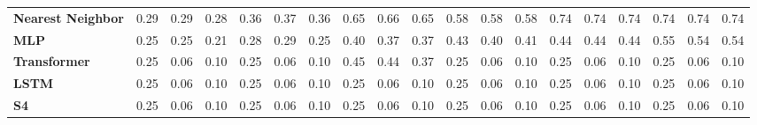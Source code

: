 \begin{table}[t]
{\begin{tabular}{l ccc ccc ccc ccc ccc ccc}
\textbf{Nearest Neighbor} & \cellcolor[HTML]{FF7B63}0.29 & \cellcolor[HTML]{FF7A64}0.29 & \cellcolor[HTML]{FF7A64}0.28 & \cellcolor[HTML]{FF9856}0.36 & \cellcolor[HTML]{FF9D54}0.37 & \cellcolor[HTML]{FF9856}0.36 & \cellcolor[HTML]{93D156}0.65 & \cellcolor[HTML]{92D156}0.66 & \cellcolor[HTML]{94D155}0.65 & \cellcolor[HTML]{C6D249}0.58 & \cellcolor[HTML]{C8D249}0.58 & \cellcolor[HTML]{C7D249}0.58 & \cellcolor[HTML]{5BCF64}0.74 & \cellcolor[HTML]{59CF64}0.74 & \cellcolor[HTML]{5ACF64}0.74 & \cellcolor[HTML]{59CF64}0.74 & \cellcolor[HTML]{59CF64}0.74 & \cellcolor[HTML]{59CF64}0.74 \\
\textbf{MLP} & \cellcolor[HTML]{FF6C6B}0.25 & \cellcolor[HTML]{FF6C6B}0.25 & \cellcolor[HTML]{FF6B6B}0.21 & \cellcolor[HTML]{FF7766}0.28 & \cellcolor[HTML]{FF7C63}0.29 & \cellcolor[HTML]{FF6B6B}0.25 & \cellcolor[HTML]{FFA94F}0.40 & \cellcolor[HTML]{FF9F53}0.37 & \cellcolor[HTML]{FF9C55}0.37 & \cellcolor[HTML]{FFB649}0.43 & \cellcolor[HTML]{FFAB4E}0.40 & \cellcolor[HTML]{FFAD4D}0.41 & \cellcolor[HTML]{FFBC46}0.44 & \cellcolor[HTML]{FFBC46}0.44 & \cellcolor[HTML]{FFBB46}0.44 & \cellcolor[HTML]{DBD344}0.55 & \cellcolor[HTML]{E3D342}0.54 & \cellcolor[HTML]{E1D342}0.54 \\
\textbf{Transformer} & \cellcolor[HTML]{FF6B6B}0.25 & \cellcolor[HTML]{FF6B6B}0.06 & \cellcolor[HTML]{FF6B6B}0.10 & \cellcolor[HTML]{FF6B6B}0.25 & \cellcolor[HTML]{FF6B6B}0.06 & \cellcolor[HTML]{FF6B6B}0.10 & \cellcolor[HTML]{FFBD46}0.45 & \cellcolor[HTML]{FFBC46}0.44 & \cellcolor[HTML]{FF9F53}0.37 & \cellcolor[HTML]{FF6B6B}0.25 & \cellcolor[HTML]{FF6B6B}0.06 & \cellcolor[HTML]{FF6B6B}0.10 & \cellcolor[HTML]{FF6B6B}0.25 & \cellcolor[HTML]{FF6B6B}0.06 & \cellcolor[HTML]{FF6B6B}0.10 & \cellcolor[HTML]{FF6B6B}0.25 & \cellcolor[HTML]{FF6B6B}0.06 & \cellcolor[HTML]{FF6B6B}0.10 \\
\textbf{LSTM} & \cellcolor[HTML]{FF6B6B}0.25 & \cellcolor[HTML]{FF6B6B}0.06 & \cellcolor[HTML]{FF6B6B}0.10 & \cellcolor[HTML]{FF6B6B}0.25 & \cellcolor[HTML]{FF6B6B}0.06 & \cellcolor[HTML]{FF6B6B}0.10 & \cellcolor[HTML]{FF6B6B}0.25 & \cellcolor[HTML]{FF6B6B}0.06 & \cellcolor[HTML]{FF6B6B}0.10 & \cellcolor[HTML]{FF6B6B}0.25 & \cellcolor[HTML]{FF6B6B}0.06 & \cellcolor[HTML]{FF6B6B}0.10 & \cellcolor[HTML]{FF6B6B}0.25 & \cellcolor[HTML]{FF6B6B}0.06 & \cellcolor[HTML]{FF6B6B}0.10 & \cellcolor[HTML]{FF6B6B}0.25 & \cellcolor[HTML]{FF6B6B}0.06 & \cellcolor[HTML]{FF6B6B}0.10 \\
\textbf{S4} & \cellcolor[HTML]{FF6B6B}0.25 & \cellcolor[HTML]{FF6B6B}0.06 & \cellcolor[HTML]{FF6B6B}0.10 & \cellcolor[HTML]{FF6B6B}0.25 & \cellcolor[HTML]{FF6B6B}0.06 & \cellcolor[HTML]{FF6B6B}0.10 & \cellcolor[HTML]{FF6B6B}0.25 & \cellcolor[HTML]{FF6B6B}0.06 & \cellcolor[HTML]{FF6B6B}0.10 & \cellcolor[HTML]{FF6B6B}0.25 & \cellcolor[HTML]{FF6B6B}0.06 & \cellcolor[HTML]{FF6B6B}0.10 & \cellcolor[HTML]{FF6B6B}0.25 & \cellcolor[HTML]{FF6B6B}0.06 & \cellcolor[HTML]{FF6B6B}0.10 & \cellcolor[HTML]{FF6B6B}0.25 & \cellcolor[HTML]{FF6B6B}0.06 & \cellcolor[HTML]{FF6B6B}0.10 \\

\end{tabular}}
\end{table}
